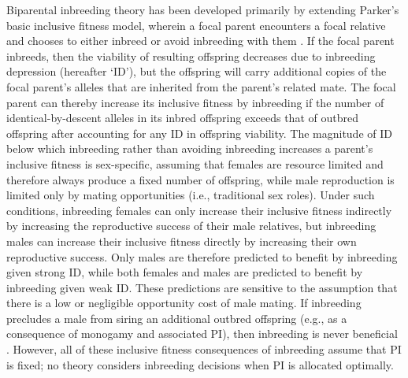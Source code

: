 \documentclass[12pt]{article}
\begin{document}
Biparental inbreeding theory has been developed primarily by extending Parker's \citeyearpar{Parker1979} basic inclusive fitness model, wherein a focal parent encounters a focal relative and chooses to either inbreed or avoid inbreeding with them \cite[e.g.,][]{Parker1979, Parker2006, Kokko2006, Duthie2015a}. If the focal parent inbreeds, then the viability of resulting offspring decreases due to inbreeding depression (hereafter `ID'), but the offspring will carry additional copies of the focal parent's alleles that are inherited from the parent's related mate. The focal parent can thereby increase its inclusive fitness by inbreeding if the number of identical-by-descent alleles in its inbred offspring exceeds that of outbred offspring after accounting for any ID in offspring viability. The magnitude of ID below which inbreeding rather than avoiding inbreeding increases a parent's inclusive fitness is sex-specific, assuming that females are resource limited and therefore always produce a fixed number of offspring, while male reproduction is limited only by mating opportunities (i.e., traditional sex roles). Under such conditions, inbreeding females can only increase their inclusive fitness indirectly by increasing the reproductive success of their male relatives, but inbreeding males can increase their inclusive fitness directly by increasing their own reproductive success. Only males are therefore predicted to benefit by inbreeding given strong ID, while both females and males are predicted to benefit by inbreeding given weak ID. These predictions are sensitive to the assumption that there is a low or negligible opportunity cost of male mating. If inbreeding precludes a male from siring an additional outbred offspring (e.g., as a consequence of monogamy and associated PI), then inbreeding is never beneficial \cite[][]{Waser1986}. However, all of these inclusive fitness consequences of inbreeding assume that PI is fixed; no theory considers inbreeding decisions when PI is allocated optimally. %
\end{document}
